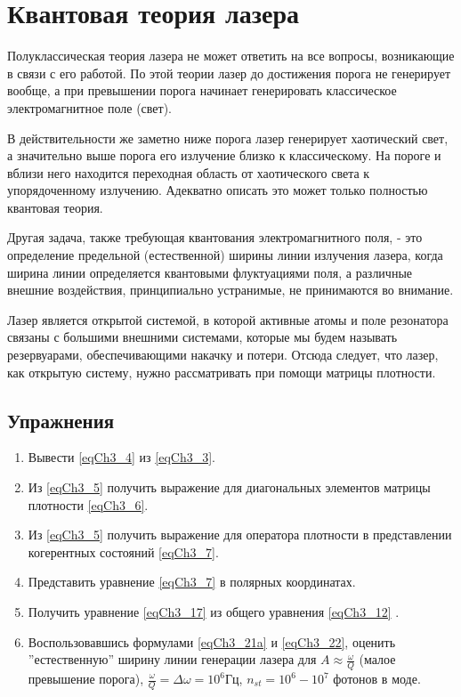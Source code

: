\chapter{Квантовая теория лазера}
\label{chLaser}

Полуклассическая теория лазера не может ответить на все вопросы,
возникающие в связи с его работой. По этой теории лазер до достижения
порога  не генерирует вообще, а при превышении порога начинает
генерировать классическое электромагнитное поле (свет). 

В действительности же заметно ниже порога лазер генерирует хаотический
свет, а значительно выше порога его излучение близко к
классическому. На пороге и вблизи него находится переходная область от
хаотического света к упорядоченному излучению. Адекватно описать это
может только полностью квантовая теория. 

Другая задача, также требующая квантования электромагнитного поля, -
это определение предельной (естественной) ширины линии излучения
лазера, когда ширина линии определяется квантовыми флуктуациями поля,
а различные внешние воздействия, принципиально устранимые, не
принимаются во внимание. 

Лазер является открытой системой, в которой активные атомы и поле
резонатора связаны с большими внешними системами, которые мы будем
называть резервуарами, обеспечивающими накачку и потери. 
Отсюда следует, что лазер, как открытую систему, нужно рассматривать
при помощи матрицы плотности.  






\section{Упражнения}
\begin{enumerate}
\item Вывести \eqref{eqCh3_4} из \eqref{eqCh3_3}.
\item Из \eqref{eqCh3_5} получить выражение для диагональных элементов
  матрицы плотности \eqref{eqCh3_6}.
\item Из \eqref{eqCh3_5} получить выражение для оператора плотности в
  представлении когерентных состояний \eqref{eqCh3_7}.
\item Представить уравнение \eqref{eqCh3_7} в полярных координатах.
\item Получить уравнение \eqref{eqCh3_17} из общего уравнения
  \eqref{eqCh3_12} .
\item Воспользовавшись формулами \eqref{eqCh3_21a} и \eqref{eqCh3_22},
  оценить ''естественную'' ширину линии генерации лазера для $A
  \approx \frac{\omega}{Q}$ (малое превышение порога), 
$\frac{\omega}{Q} = \Delta \omega = 10^6 \mbox{Гц}$, 
$n_{st} = 10^6 - 10^7$ фотонов в моде. 
\end{enumerate}

